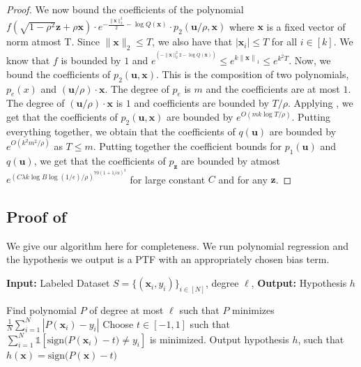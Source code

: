 \documentclass{theoretics}
\newcommand\twonorm[1]{\|#1\|_2}
\newcommand\norm[1]{\left\| #1 \right\|}
\renewcommand\vec[1]{\mathbf{#1}}
\newcommand{\sign}{\mathrm{sign}}
\newcommand{\1}{\Ind}
\newcommand{\x}{\vec x}
\newcommand{\vu}{\vec u}
\newcommand{\z}{\vec z}
\newcommand{\ind}{\mathds{1}}
\begin{document}
\begin{proof}
We now bound the coefficients of the polynomial $f(\sqrt{1-\rho^2}\z+\rho\x)\cdot e^{-\frac{\twonorm{\x}^2}{2}-\log Q(\x)}\cdot p_2(\vu/\rho,\x)$ where $\x$ is a fixed vector of norm atmost T. Since $\twonorm{\x}\leq T$, we also have that $|\x_i|\leq T$ for all $i\in [k]$. We know that $f$ is bounded by $1$ and $e^{^{\left(-{\twonorm{\x}^2}{2} -\log Q(\x)\right)}}\leq e^{k\norm{\x}_1}\leq e^{k^2T}$. Now, we bound the coefficients of $p_2(\vu,\x)$. This is the composition of two polynomials, $p_e(x)$ and $(\vu/\rho)\cdot \x$. The degree of $p_e$ is $m$ and the coefficients are at most $1$. The degree of $(\vu/\rho)\cdot \x$ is $1$ and coefficients are bounded by $T/\rho$. Applying , we get that the coefficients of $p_2(\vu,\x)$ are bounded by $e^{O\left(mk\log T/\rho\right)}$.  Putting everything together, we obtain that the coefficients of $q(\vu)$ are bounded by $e^{O({k^2m^2/\rho})}$ as $T\leq m$. Putting together the coefficient bounds for $p_1(\vu)$ and $q(\vu)$, we get that the coefficients of $p_{\z}$ are bounded by atmost $e^{\left(C\lambda k\log B\log (1/\epsilon)/\rho\right)^{70(1+1/\alpha)^3}}$ for large constant $C$ and for any $\z$.
\end{proof}

\subsection{\texorpdfstring{Proof of }{Proof of Theorem D.7}}
We give our algorithm here for completeness. We run polynomial regression and the hypothesis we output is a PTF with an appropriately chosen bias term.



\iffalse
 \begin{algorithm} 
  \caption{Agnostic Learner for Smooth Boolean Concepts}
  \label{alg:smooth_boolean}
\begin{algorithmic}
  
\STATE \textbf{Input:} Labeled Dataset $S=\{(\x_i,y_i)\}_{i\in [N]}$, degree $\ell$,
\STATE \textbf{Output:} Hypothesis $h$
\STATE 

\STATE Find polynomial $P$ of degree at most $\ell$ such that $P$ minimizes $\frac{1}{N}\sum_{i=1}^{N}|P(\x_i)-y_i|$
\STATE Choose $t\in [-1,1]$ such that $\sum_{i=1}^{N}\ind[\sign\bigl(P(\x_i)-t\bigr)\neq y_i]$ is minimized.
\STATE Output hypothesis $h$, such that $h(\x)=\sign\bigl(P(\x)-t\bigr)$

\end{algorithmic}
\end{algorithm}
\end{document}

